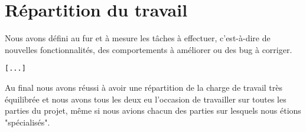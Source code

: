 \section{Répartition du travail}

Nous avons défini au fur et à mesure les tâches à effectuer, c'est-à-dire de
nouvelles fonctionnalités, des comportements à améliorer ou des bug à
corriger. 

\verb![...]!

Au final nous avons réussi à avoir une répartition de la charge de travail
très équilibrée et nous avons tous les deux eu l'occasion de travailler sur
toutes les parties du projet, même si nous avions chacun des parties sur
lesquels nous étions "spécialisés".
